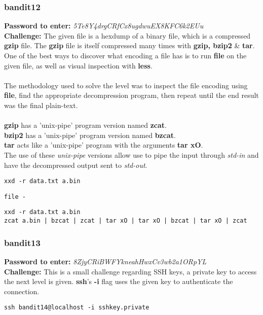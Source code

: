 \documentclass[a4paper]{article}
\newcommand{\pass}[1]{\textbf{Password to enter:} \textit{#1}\\}
\newcommand{\chall}{\textbf{Challenge:} }
\begin{document}
\subsubsection{bandit12}
\pass{5Te8Y4drgCRfCx8ugdwuEX8KFC6k2EUu}
\chall The given file is a hexdump of a binary file, which is a compressed \textbf{gzip} file. The \textbf{gzip} file is itself compressed many times with \textbf{gzip, bzip2} \& \textbf{tar}. One of the best ways to discover what encoding a file has is to run \textbf{file} on the given file, as well as visual inspection with \textbf{less}.
\\\\
The methodology used to solve the level was to inspect the file encoding using \textbf{file}, find the appropriate decompression program, then repeat until the end result was the final plain-text.
\\\\
\textbf{gzip} has a 'unix-pipe' program version named \textbf{zcat}.\\
\textbf{bzip2} has a 'unix-pipe' program version named \textbf{bzcat}.\\
\textbf{tar} acts like a 'unix-pipe' program with the arguments \textbf{tar xO}.
\\
The use of these \textit{unix-pipe} versions allow use to pipe the input through \textit{std-in} and have the decompressed output sent to \textit{std-out}.
\begin{lstlisting}[title=to uncompress a hexdump]
xxd -r data.txt a.bin
\end{lstlisting}
\begin{lstlisting}[title=to test the file encoding/type from std-in]
file -
\end{lstlisting}
\begin{lstlisting}[title=the series of decompression required]
xxd -r data.txt a.bin
zcat a.bin | bzcat | zcat | tar xO | tar xO | bzcat | tar xO | zcat
\end{lstlisting}

\subsubsection{bandit13}
\pass{8ZjyCRiBWFYkneahHwxCv3wb2a1ORpYL}
\chall This is a small challenge regarding SSH keys, a private key to access the next level is given. \textbf{ssh}'s \textbf{-i} flag uses the given key to authenticate the connection.
\begin{lstlisting}
ssh bandit14@localhost -i sshkey.private
\end{lstlisting}
\end{document}
